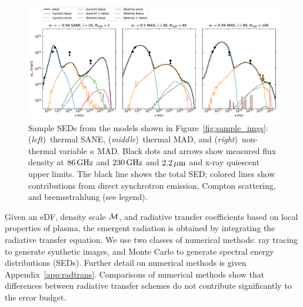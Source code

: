 \begin{figure}
  \centering
  \includegraphics[width=\textwidth]{figures/sample_seds.pdf}
  \caption{Sample SEDs from the models shown in
    Figure~\ref{fig:sample_imgs}:
    (\emph{left})~thermal SANE,
    (\emph{middle})~thermal MAD, and
    (\emph{right})~non-thermal variable $\kappa$ MAD.  Black dots and arrows show measured flux density at $86\,\mathrm{GHz}$ and $230\,\mathrm{GHz}$ and $2.2\,\mu\mathrm{m}$ and x-ray quiescent upper limits. The black line shows the total SED; colored lines show contributions from direct synchrotron emission, Compton scattering, and bremsstrahlung (see legend).
    }
  \label{fig:sample_seds}
\end{figure}

Given an eDF, density scale $\mathcal{M}$, and radiative transfer coefficients based on local properties of plasma, the emergent radiation is obtained by integrating the radiative transfer equation.
We use two classes of numerical methods: ray tracing to generate synthetic images, and Monte Carlo to generate spectral energy distributions (SEDs).
Further detail on numerical methods is given Appendix~\ref{app:radtrans}.
Comparisons of numerical methods \citep{2020ApJ...897..148G, Prather_et_al_2022} show that differences between radiative transfer schemes do not contribute significantly to the error budget.

